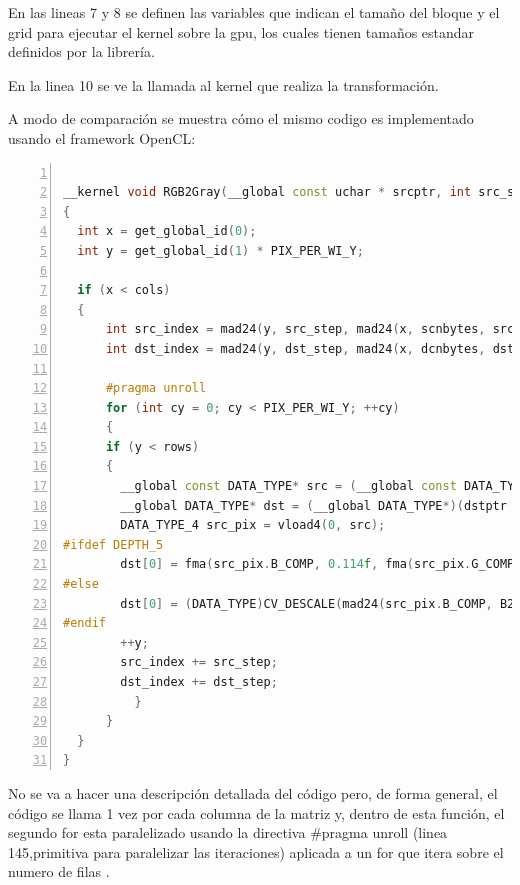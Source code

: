 \documentclass[a4paper,10pt]{report}
\begin{document}
En las lineas 7 y 8 se definen las variables que indican el tamaño del bloque y el grid para ejecutar el kernel sobre la gpu, los cuales tienen tamaños estandar definidos por la librería.

En la linea 10 se ve la llamada al kernel que realiza la transformación.








A modo de comparación se muestra cómo el mismo codigo es implementado usando el framework OpenCL:

\begin{lstlisting}[frame=bt,title={aa},caption={imgproc/src/opencl/cvtcolor.cl},
columns=fullflexible,numbers=left,backgroundcolor=\color{LemonChiffon1},basicstyle=\footnotesize,keywordstyle=\ttfamily\footnotesize,language=C++,stringstyle=\ttfamily,breaklines=true,xleftmargin=0.5em,xrightmargin=0pt,aboveskip=\bigskipamount,belowskip=\bigskipamount]

__kernel void RGB2Gray(__global const uchar * srcptr, int src_step, int src_offset, __global uchar * dstptr, int dst_step, int dst_offset, int rows, int cols)
{
  int x = get_global_id(0);
  int y = get_global_id(1) * PIX_PER_WI_Y;

  if (x < cols)
  {
      int src_index = mad24(y, src_step, mad24(x, scnbytes, src_offset));
      int dst_index = mad24(y, dst_step, mad24(x, dcnbytes, dst_offset));

      #pragma unroll
      for (int cy = 0; cy < PIX_PER_WI_Y; ++cy)
      {
	  if (y < rows)
	  {
	    __global const DATA_TYPE* src = (__global const DATA_TYPE*)(srcptr + src_index);
	    __global DATA_TYPE* dst = (__global DATA_TYPE*)(dstptr + dst_index);
	    DATA_TYPE_4 src_pix = vload4(0, src);
#ifdef DEPTH_5
	    dst[0] = fma(src_pix.B_COMP, 0.114f, fma(src_pix.G_COMP, 0.587f, src_pix.R_COMP * 0.299f));
#else
	    dst[0] = (DATA_TYPE)CV_DESCALE(mad24(src_pix.B_COMP, B2Y, mad24(src_pix.G_COMP, G2Y, mul24(src_pix.R_COMP, R2Y))), yuv_shift);
#endif
	    ++y;
	    src_index += src_step;
	    dst_index += dst_step;
          }
      }
  }
}
\end{lstlisting}


No se va a hacer una descripción detallada del código pero, de forma general, el código se llama 1 vez por cada columna de la matriz y, dentro de esta función, el segundo for esta paralelizado usando la directiva \#pragma unroll (linea 145,primitiva para paralelizar las iteraciones) aplicada a un for que itera sobre el numero de filas .
\end{document}
